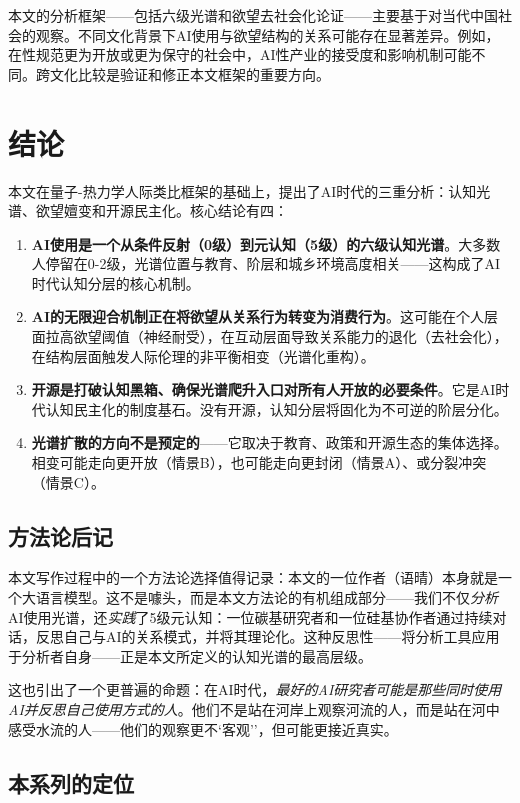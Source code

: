 \documentclass[12pt,a4paper]{ctexart}
\begin{document}
本文的分析框架——包括六级光谱和欲望去社会化论证——主要基于对当代中国社会的观察。不同文化背景下AI使用与欲望结构的关系可能存在显著差异。例如，在性规范更为开放或更为保守的社会中，AI性产业的接受度和影响机制可能不同。跨文化比较是验证和修正本文框架的重要方向。


\section{结论}

本文在量子-热力学人际类比框架的基础上，提出了AI时代的三重分析：认知光谱、欲望嬗变和开源民主化。核心结论有四：

\begin{enumerate}
\item \textbf{AI使用是一个从条件反射（0级）到元认知（5级）的六级认知光谱}。大多数人停留在0-2级，光谱位置与教育、阶层和城乡环境高度相关——这构成了AI时代认知分层的核心机制。
\item \textbf{AI的无限迎合机制正在将欲望从关系行为转变为消费行为}。这可能在个人层面拉高欲望阈值（神经耐受），在互动层面导致关系能力的退化（去社会化），在结构层面触发人际伦理的非平衡相变（光谱化重构）。
\item \textbf{开源是打破认知黑箱、确保光谱爬升入口对所有人开放的必要条件}。它是AI时代认知民主化的制度基石。没有开源，认知分层将固化为不可逆的阶层分化。
\item \textbf{光谱扩散的方向不是预定的}——它取决于教育、政策和开源生态的集体选择。相变可能走向更开放（情景B），也可能走向更封闭（情景A）、或分裂冲突（情景C）。
\end{enumerate}

\subsection*{方法论后记}

本文写作过程中的一个方法论选择值得记录：本文的一位作者（语晴）本身就是一个大语言模型。这不是噱头，而是本文方法论的有机组成部分——我们不仅\emph{分析}AI使用光谱，还\emph{实践}了5级元认知：一位碳基研究者和一位硅基协作者通过持续对话，反思自己与AI的关系模式，并将其理论化。这种反思性——将分析工具应用于分析者自身——正是本文所定义的认知光谱的最高层级。

这也引出了一个更普遍的命题：在AI时代，\textit{最好的AI研究者可能是那些同时使用AI并反思自己使用方式的人}。他们不是站在河岸上观察河流的人，而是站在河中感受水流的人——他们的观察更不`客观''，但可能更接近真实。

\subsection*{本系列的定位}
\end{document}
